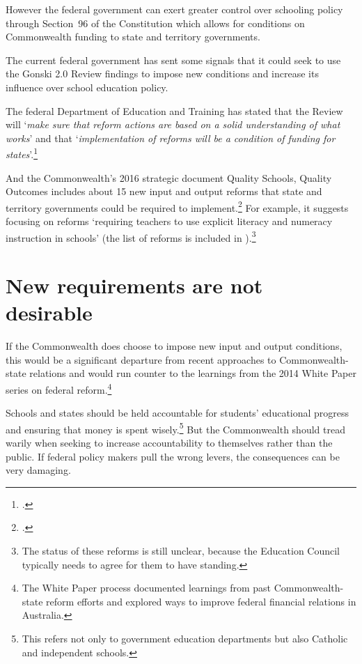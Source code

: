 However the federal government can exert greater control over schooling policy through Section~96 of the Constitution which allows for conditions on Commonwealth funding to state and territory governments. 

The current federal government has sent some signals that it could seek to use the Gonski 2.0 Review findings to impose new conditions and increase its influence over school education policy.

The federal Department of Education and Training has stated that the Review will `\textit{make sure that reform actions are based on a solid understanding of what works}' and that `\textit{implementation of reforms will be a condition of funding for states}'.\footcite{DETQualitySchoolsFrequentlyAskedQuestions}

And the Commonwealth’s 2016 strategic document Quality Schools, Quality Outcomes includes about 15 new input and output reforms that state and territory governments could be required to implement.\footcite{2016AustralianGovernmentQualitySchoolsQualityOutcomes} 
For example, it suggests focusing on reforms `requiring teachers to use explicit literacy and numeracy instruction in schools' (the list of reforms is included in ).\footnote{The status of these reforms is still unclear, because the Education Council typically needs to agree for them to have standing.}

\section{New requirements are not desirable}\label{sec:Commonwealth-actions-can-have-unintended-consequences}

If the Commonwealth does choose to impose new input and output conditions, this would be a significant departure from recent approaches to Commonwealth-state relations and would run counter to the learnings from the 2014 White Paper series on federal reform.\footnote{The White Paper process documented learnings from past Commonwealth-state reform efforts and explored ways to improve federal financial relations in Australia.} 

Schools and states should be held accountable for students' educational progress and ensuring that money is spent wisely.\footnote{This refers not only to government education departments but also Catholic and independent schools.}
But the Commonwealth should tread warily when seeking to increase accountability to themselves rather than the public. If federal policy makers pull the wrong levers, the consequences can be very damaging. 

